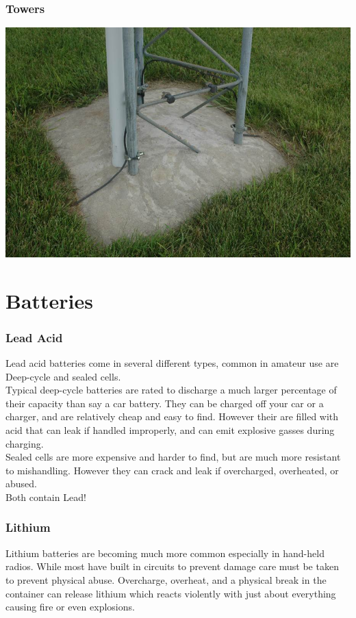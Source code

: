 \documentclass[10pt, handout]{beamer}
\begin{document}
\begin{frame}
\frametitle{Towers}
\includegraphics[height=.9\textheight, width=.9\textwidth]{towerground.jpg}
\end{frame}

\section{Batteries}

\begin{frame}
\frametitle{Lead Acid}
Lead acid batteries come in several different types, common in amateur use are Deep-cycle and sealed cells.\\
Typical deep-cycle batteries are rated to discharge a much larger percentage of their capacity than say a car battery. They can be charged off your car or a charger, and are relatively cheap and easy to find. However their are filled with acid that can leak if handled improperly, and can emit explosive gasses during charging.\\
Sealed cells are more expensive and harder to find, but are much more resistant to mishandling. However they can crack and leak if overcharged, overheated, or abused.\\
Both contain Lead! 
\end{frame}

\begin{frame}
\frametitle{Lithium}
Lithium batteries are becoming much more common especially in hand-held radios. While most have built in circuits to prevent damage care must be taken to prevent physical abuse. Overcharge, overheat, and a physical break in the container can release lithium which reacts violently with just about everything causing fire or even explosions.
\end{frame}
\end{document}
